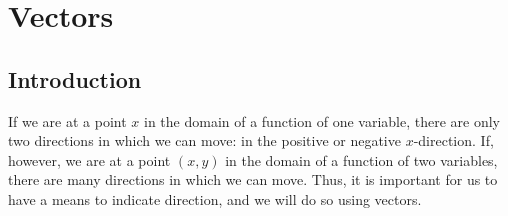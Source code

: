 \section{Vectors} \label{S:9.2.Vectors}


\vspace*{-14 pt}

\subsection*{Introduction}

If we are at a point $x$ in the domain of a function of one variable,
there are only two directions in which we can move: in the positive or
negative $x$-direction. If, however, we are at a point $(x,y)$ in the domain of
a function of two variables, there are many
directions in which we can move. Thus, it is important for us to have
a means to indicate direction, and we will do so using vectors.




